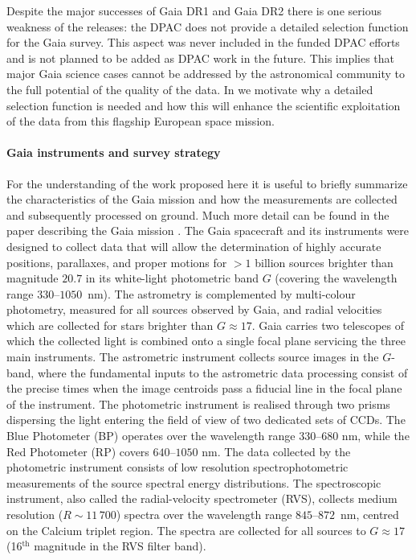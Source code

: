 Despite the major successes of Gaia DR1 and Gaia DR2 there is one serious weakness of the releases: the DPAC does not provide a detailed selection function for the Gaia survey. This aspect was never included in the funded DPAC efforts and is not planned to be added as DPAC work in the future. This implies that major Gaia science cases cannot be addressed by the astronomical community to the full potential of the quality of the data. In  we motivate why a detailed selection function is needed and how this will enhance the scientific exploitation of the data from this flagship European space mission. 

\paragraph{Gaia instruments and survey strategy} For the understanding of the work proposed here it is useful to briefly summarize the characteristics of the Gaia mission and how the measurements are collected and subsequently processed on ground. Much more detail can be found in the paper describing the Gaia mission \cite{2016A&A...595A...1G}. The Gaia spacecraft and its instruments were designed to collect data that will allow the determination of highly accurate positions, parallaxes, and proper motions for $>1$ billion sources brighter than magnitude $20.7$ in its white-light photometric band $G$ (covering the wavelength range $330$--$1050$~nm). The astrometry is complemented by multi-colour photometry, measured for all sources observed by Gaia, and radial velocities which are collected for stars brighter than $G\approx17$. Gaia carries two telescopes of which the collected light is combined onto a single focal plane servicing the three main instruments. The astrometric instrument collects source images in the $G$-band, where the fundamental inputs to the astrometric data processing consist of the precise times when the image centroids pass a fiducial line in the focal plane of the instrument. The photometric instrument is realised through two prisms dispersing the light entering the field of view of two dedicated sets of CCDs. The Blue Photometer (BP) operates over the wavelength range $330$--$680$ nm, while the Red Photometer (RP) covers $640$--$1050$ nm. The data collected by the photometric instrument consists of low resolution spectrophotometric measurements of the source spectral energy distributions. The spectroscopic instrument, also called the radial-velocity spectrometer (RVS), collects medium resolution ($R\sim11\,700$) spectra over the wavelength range $845$--$872$~nm, centred on the Calcium triplet region. The spectra are collected for all sources to $G\approx17$ (16$^\text{th}$ magnitude in the RVS filter band).

